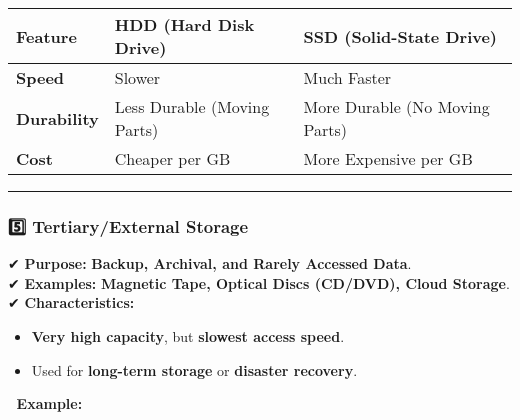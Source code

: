 \documentclass[
]{article}
\providecommand{\tightlist}{%
  \setlength{\itemsep}{0pt}\setlength{\parskip}{0pt}}
\begin{document}
\begin{longtable}[]{@{}
  >{\raggedright\arraybackslash}p{}
  >{\raggedright\arraybackslash}p{}
  >{\raggedright\arraybackslash}p{}@{}}
\toprule\noalign{}
\begin{minipage}[b]{\linewidth}\raggedright
\textbf{Feature}
\end{minipage} & \begin{minipage}[b]{\linewidth}\raggedright
\textbf{HDD (Hard Disk Drive)}
\end{minipage} & \begin{minipage}[b]{\linewidth}\raggedright
\textbf{SSD (Solid-State Drive)}
\end{minipage} \\
\midrule\noalign{}
\endhead
\bottomrule\noalign{}
\endlastfoot
\textbf{Speed} & Slower & Much Faster \\
\textbf{Durability} & Less Durable (Moving Parts) & More Durable (No
Moving Parts) \\
\textbf{Cost} & Cheaper per GB & More Expensive per GB \\
\end{longtable}

\begin{center}\rule{0.5\linewidth}{0.5pt}\end{center}

\subsubsection{\texorpdfstring{\textbf{5️⃣ Tertiary/External
Storage}}{5️⃣ Tertiary/External Storage}}\label{tertiaryexternal-storage}

✔ \textbf{Purpose:} \textbf{Backup, Archival, and Rarely Accessed
Data}.\\
✔ \textbf{Examples:} \textbf{Magnetic Tape, Optical Discs (CD/DVD),
Cloud Storage}.\\
✔ \textbf{Characteristics:}

\begin{itemize}
\tightlist
\item
  \textbf{Very high capacity}, but \textbf{slowest access speed}.
\item
  Used for \textbf{long-term storage} or \textbf{disaster recovery}.
\end{itemize}

📌 \textbf{Example:}
\end{document}
